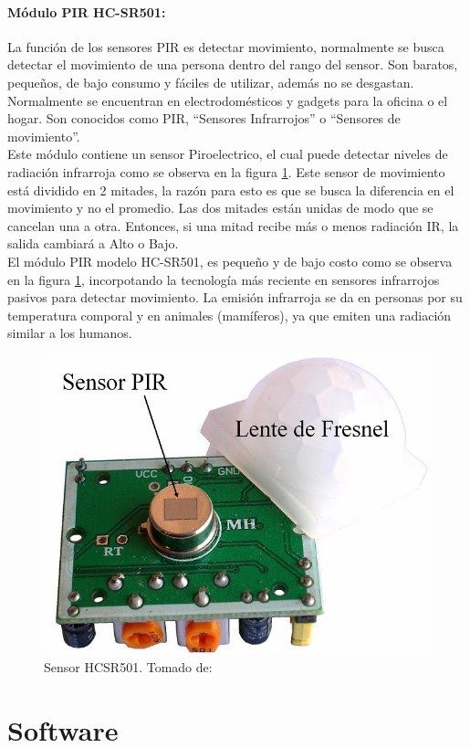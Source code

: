 \paragraph{Módulo PIR HC-SR501: }

La función de los sensores PIR es detectar movimiento, normalmente se busca detectar el movimiento de una persona dentro del rango del sensor. Son baratos, pequeños, de bajo consumo y fáciles de utilizar, además no se desgastan. Normalmente se encuentran en electrodomésticos y gadgets para la oficina o el hogar. Son conocidos como PIR, ``Sensores Infrarrojos'' o ``Sensores de movimiento''.\\

Este módulo contiene un sensor Piroelectrico, el cual puede detectar niveles de radiación infrarroja como se observa en la figura \ref{fig:sensor-hc-sr501-1000-m}. Este sensor de movimiento está dividido en 2 mitades, la razón para esto es que se busca la diferencia en el movimiento y no el promedio. Las dos mitades están unidas  de modo que se cancelan una a otra. Entonces, si una mitad recibe más o menos radiación IR, la salida cambiará a Alto o Bajo. \cite{PIR1}\\

El módulo PIR modelo HC-SR501, es pequeño y de bajo costo como se observa en la figura \ref{fig:sensor-hc-sr501-1000-m}, incorpotando la tecnología más reciente en sensores infrarrojos pasivos para detectar movimiento. La emisión infrarroja se da en personas por su temperatura comporal y en animales (mamíferos), ya que emiten una radiación similar a los humanos. \cite{PIR2}

\begin{figure}[H]
	\centering
	\caption{Sensor HCSR501. Tomado de: \cite{PIR2}}
	\label{fig:sensor-hc-sr501-1000-m}
	\includegraphics[width=0.5\linewidth]{Imagenes/SENSOR-HC-SR501-1000-M}
\end{figure}

\section{Software}

